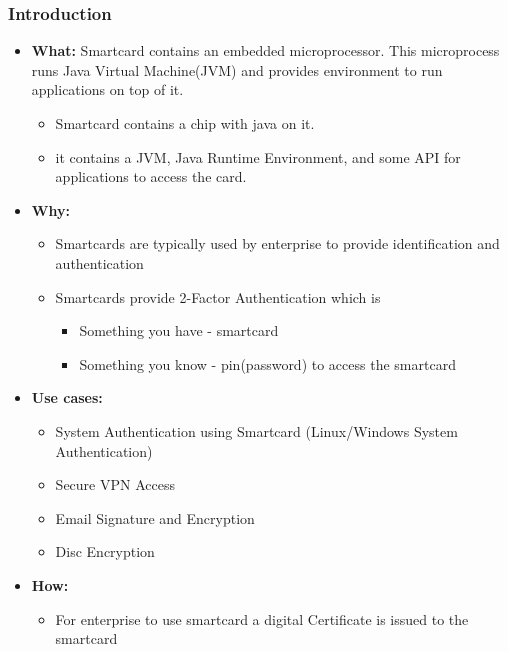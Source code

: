 \documentclass[a4paper]{article}
\begin{document}
\subsubsection{Introduction}
    \begin{itemize}
        \item \textbf{What:} Smartcard contains an embedded microprocessor. This microprocess runs Java Virtual Machine(JVM) and 
            provides environment to run applications on top of it. 
            \begin{itemize}
                \item Smartcard contains a chip with java on it. 
                \item it contains a JVM, Java Runtime Environment, and some API for applications to access the card.
            \end{itemize}
        \item \textbf{Why:} 
            \begin{itemize}
                \item Smartcards are typically used by enterprise to provide identification and authentication
                \item Smartcards provide 2-Factor Authentication which is 
                    \begin{itemize}
                        \item Something you have - smartcard
                        \item Something you know - pin(password) to access the smartcard
                    \end{itemize}
            \end{itemize}
        \item \textbf{Use cases:}
            \begin{itemize}
                \item System Authentication using Smartcard (Linux/Windows System Authentication)
                \item Secure VPN Access
                \item Email Signature and Encryption
                \item Disc Encryption
            \end{itemize}
        \item \textbf{How:}
            \begin{itemize}
                \item For enterprise to use smartcard a digital Certificate is issued to the smartcard

\end{itemize}
\end{itemize}
\end{document}
